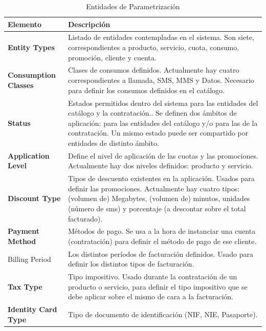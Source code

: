 \begin{table}[H]
  \centering
  \setlength{\leftmargini}{0.4cm}
  \resizebox{14cm}{!} {
  \begin{tabular}{|m{4cm} m{11cm}|}
  \rowcolor{udcpink!25}
  \hline
  	\textbf{Elemento} & \textbf{Descripción} \\\hline
	\textbf{Entity Types} & Listado de entidades contempladas en el sistema. Son siete, correspondientes a producto, servicio, cuota, consumo, promoción, cliente y cuenta.   \\
	\textbf{Consumption Classes} & Clases de consumos definidos. Actualmente hay cuatro correspondientes a llamada, SMS, MMS y Datos. Necesario para definir los consumos definidos en el catálogo. \\
	\textbf{Status} & Estados permitidos dentro del sistema para las entidades del catálogo y la contratación.. Se definen dos ámbitos de aplicación: para las entidades del catálogo y/o para las de la contratación. Un mismo estado puede ser compartido por entidades de distinto ámbito. \\
	\textbf{Application Level} & Define el nivel de aplicación de las cuotas y las promociones. Actualmente hay dos niveles definidos: producto y servicio.  \\
	\textbf{Discount Type} & Tipos de descuento existentes en la aplicación. Usados para definir las promociones. Actualmente hay cuatro tipos: (volumen de) Megabytes, (volumen de) minutos, unidades (número de sms) y porcentaje (a descontar sobre el total facturado).   \\
	\textbf{Payment Method} & Métodos de pago. Se usa a la hora de instanciar una cuenta (contratación) para definir el método de pago de ese cliente. \\
Billing Period & Los distintos períodos de facturación definidos. Usado para definir los distintos tipos de facturación. \\
	\textbf{Tax Type} & Tipo impositivo. Usado durante la contratación de un producto o servicio, para definir el tipo impositivo que se debe aplicar sobre el mismo de cara a la facturación.\\
	\textbf{Identity Card Type} & Tipo de documento de identificación (NIF, NIE, Pasaporte).
	\\\hline
  \end{tabular}
  } %
  \caption{Entidades de Parametrización}
  \label{tab:parametrizacion}
\end{table}

